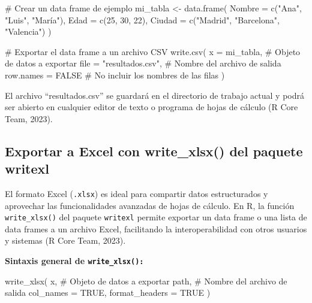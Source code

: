 \documentclass[
  spanish,
  a4paper,
  DIV=11,
  numbers=noendperiod,
  onepage,
  openany]{scrreprt}
\newenvironment{Shaded}{\begin{snugshade}}{\end{snugshade}}
\newcommand{\AttributeTok}[1]{\textcolor[rgb]{0.40,0.45,0.13}{#1}}
\newcommand{\CommentTok}[1]{\textcolor[rgb]{0.37,0.37,0.37}{#1}}
\newcommand{\ConstantTok}[1]{\textcolor[rgb]{0.56,0.35,0.01}{#1}}
\newcommand{\DecValTok}[1]{\textcolor[rgb]{0.68,0.00,0.00}{#1}}
\newcommand{\FunctionTok}[1]{\textcolor[rgb]{0.28,0.35,0.67}{#1}}
\newcommand{\NormalTok}[1]{\textcolor[rgb]{0.00,0.23,0.31}{#1}}
\newcommand{\OtherTok}[1]{\textcolor[rgb]{0.00,0.23,0.31}{#1}}
\newcommand{\StringTok}[1]{\textcolor[rgb]{0.13,0.47,0.30}{#1}}
\begin{document}
\begin{Shaded}
\begin{Highlighting}[]
\CommentTok{\# Crear un data frame de ejemplo}
\NormalTok{mi\_tabla }\OtherTok{\textless{}{-}} \FunctionTok{data.frame}\NormalTok{(}
  \AttributeTok{Nombre =} \FunctionTok{c}\NormalTok{(}\StringTok{"Ana"}\NormalTok{, }\StringTok{"Luis"}\NormalTok{, }\StringTok{"María"}\NormalTok{),}
  \AttributeTok{Edad =} \FunctionTok{c}\NormalTok{(}\DecValTok{25}\NormalTok{, }\DecValTok{30}\NormalTok{, }\DecValTok{22}\NormalTok{),}
  \AttributeTok{Ciudad =} \FunctionTok{c}\NormalTok{(}\StringTok{"Madrid"}\NormalTok{, }\StringTok{"Barcelona"}\NormalTok{, }\StringTok{"Valencia"}\NormalTok{)}
\NormalTok{)}

\CommentTok{\# Exportar el data frame a un archivo CSV}
\FunctionTok{write.csv}\NormalTok{(}
  \AttributeTok{x =}\NormalTok{ mi\_tabla,         }\CommentTok{\# Objeto de datos a exportar}
  \AttributeTok{file =} \StringTok{"resultados.csv"}\NormalTok{, }\CommentTok{\# Nombre del archivo de salida}
  \AttributeTok{row.names =} \ConstantTok{FALSE}     \CommentTok{\# No incluir los nombres de las filas }
\NormalTok{)}
\end{Highlighting}
\end{Shaded}

El archivo ``resultados.csv'' se guardará en el directorio de trabajo
actual y podrá ser abierto en cualquier editor de texto o programa de
hojas de cálculo (R Core Team, 2023).

\subsection{Exportar a Excel con write\_xlsx() del paquete
writexl}\label{exportar-a-excel-con-write_xlsx-del-paquete-writexl}

El formato Excel (\texttt{.xlsx}) es ideal para compartir datos
estructurados y aprovechar las funcionalidades avanzadas de hojas de
cálculo. En R, la función \texttt{write\_xlsx()} del paquete
\texttt{writexl} permite exportar un data frame o una lista de data
frames a un archivo Excel, facilitando la interoperabilidad con otros
usuarios y sistemas (R Core Team, 2023).

\textbf{Sintaxis general de \texttt{write\_xlsx():}}

\begin{Shaded}
\begin{Highlighting}[]
\FunctionTok{write\_xlsx}\NormalTok{(}
\NormalTok{  x,           }\CommentTok{\# Objeto de datos a exportar }
\NormalTok{  path,        }\CommentTok{\# Nombre del archivo de salida }
  \AttributeTok{col\_names =} \ConstantTok{TRUE}\NormalTok{, }
  \AttributeTok{format\_headers =} \ConstantTok{TRUE} 
\NormalTok{)}
\end{Highlighting}
\end{Shaded}
\end{document}
